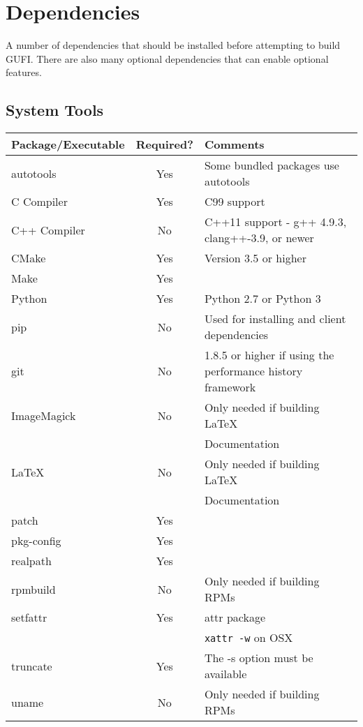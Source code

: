 \section{Dependencies}
A number of dependencies that should be installed before attempting to
build GUFI. There are also many optional dependencies that can enable
optional features.

\subsection{System Tools}
\begin{tabularx}{\textwidth}{| l | c | X | }
  \hline
  Package/Executable & Required? & Comments \\
  \hline
  autotools & Yes & Some bundled packages use autotools \\
  \hline
  C Compiler & Yes & C99 support \\
  \hline
  C++ Compiler & No & C++11 support - g++ 4.9.3, clang++-3.9, or newer
  \hfill \\
  \hline
  CMake & Yes & Version 3.5 or higher \\
  \hline
  Make & Yes & \\
  \hline
  Python & Yes & Python 2.7 or Python 3 \\
  \hline
  pip & No & Used for installing and client dependencies \\
  \hline
  git & No & 1.8.5 or higher if using the performance history
  framework \\
  \hline
  ImageMagick & No & Only needed if building \LaTeX \hfill \\
  & & Documentation \hfill \\
  \hline
  \LaTeX & No & Only needed if building \LaTeX \hfill \\
  & & Documentation \hfill \\
  \hline
  patch & Yes & \\
  \hline
  pkg-config & Yes & \\
  \hline
  realpath & Yes & \\
  \hline
  rpmbuild & No & Only needed if building RPMs \\
  \hline
  setfattr & Yes & attr package \\
  & & \texttt{xattr -w} on OSX \\
  \hline
  truncate & Yes & The -s option must be available \\
  \hline
  uname & No & Only needed if building RPMs \\
  \hline
\end{tabularx}


